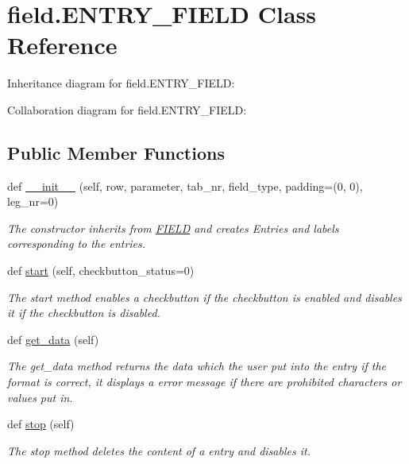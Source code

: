 \hypertarget{classfield_1_1ENTRY__FIELD}{}\section{field.\+E\+N\+T\+R\+Y\+\_\+\+F\+I\+E\+LD Class Reference}
\label{classfield_1_1ENTRY__FIELD}


Inheritance diagram for field.\+E\+N\+T\+R\+Y\+\_\+\+F\+I\+E\+LD\+:


Collaboration diagram for field.\+E\+N\+T\+R\+Y\+\_\+\+F\+I\+E\+LD\+:
\subsection*{Public Member Functions}
\begin{DoxyCompactItemize}
\item 
def \hyperlink{classfield_1_1ENTRY__FIELD_a9b1f1028d872599a49fc24758320fc96}{\+\_\+\+\_\+init\+\_\+\+\_\+} (self, row, parameter, tab\+\_\+nr, field\+\_\+type, padding=(0, 0), leg\+\_\+nr=0)
\begin{DoxyCompactList}\small\item\em The constructor inherits from \hyperlink{classfield_1_1FIELD}{F\+I\+E\+LD} and creates Entries and labels corresponding to the entries. \end{DoxyCompactList}\item 
def \hyperlink{classfield_1_1ENTRY__FIELD_ae2e9fcabf60c2a2865bff3de226e97a3}{start} (self, checkbutton\+\_\+status=0)
\begin{DoxyCompactList}\small\item\em The start method enables a checkbutton if the checkbutton is enabled and disables it if the checkbutton is disabled. \end{DoxyCompactList}\item 
def \hyperlink{classfield_1_1ENTRY__FIELD_a507d037b7c07b2da5c7d344e20d32fac}{get\+\_\+data} (self)
\begin{DoxyCompactList}\small\item\em The get\+\_\+data method returns the data which the user put into the entry if the format is correct, it displays a error message if there are prohibited characters or values put in. \end{DoxyCompactList}\item 
def \hyperlink{classfield_1_1ENTRY__FIELD_ad87b69becbcd6dd90bd3854e53a72195}{stop} (self)
\begin{DoxyCompactList}\small\item\em The stop method deletes the content of a entry and disables it. \end{DoxyCompactList}\end{DoxyCompactItemize}
